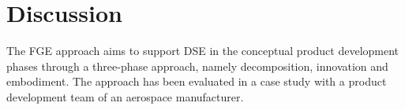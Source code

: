 \documentclass[preprints,article,accept,moreauthors,pdftex]{Definitions/mdpi}
\begin{document}

\section{Discussion} \label{sec:discussion}
The \ac{FGE} approach aims to support \ac{DSE} in the conceptual product development phases through a three-phase approach, namely decomposition, innovation and embodiment.
The approach has been evaluated in a case study with a product development team of an aerospace manufacturer.
\end{document}
